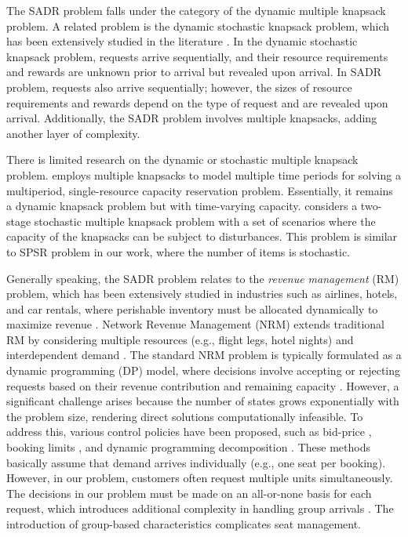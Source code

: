 The SADR problem falls under the category of the dynamic multiple knapsack problem. A related problem is the dynamic stochastic knapsack problem, which has been extensively studied in the literature \citep{kleywegt1998dynamic, kleywegt2001dynamic, papastavrou1996dynamic}. In the dynamic stochastic knapsack problem, requests arrive sequentially, and their resource requirements and rewards are unknown prior to arrival but revealed upon arrival. In SADR problem, requests also arrive sequentially; however, the sizes of resource requirements and rewards depend on the type of request and are revealed upon arrival. Additionally, the SADR problem involves multiple knapsacks, adding another layer of complexity.


There is limited research on the dynamic or stochastic multiple knapsack problem. \citep{perry2009approximate} employs multiple knapsacks to model multiple time periods for solving a multiperiod, single-resource capacity reservation problem. Essentially, it remains a dynamic knapsack problem but with time-varying capacity. \citep{tonissen2017column} considers a two-stage stochastic multiple knapsack problem with a set of scenarios where the capacity of the knapsacks can be subject to disturbances. This problem is similar to SPSR problem in our work, where the number of items is stochastic.


Generally speaking, the SADR problem relates to the \textit{revenue management} (RM) problem, which has been extensively studied in industries such as airlines, hotels, and car rentals, where perishable inventory must be allocated dynamically to maximize revenue \citep{van2005introduction}. Network Revenue Management (NRM) extends traditional RM by considering multiple resources (e.g., flight legs, hotel nights) and interdependent demand \citep{williamson1992airline}. The standard NRM problem is typically formulated as a dynamic programming (DP) model, where decisions involve accepting or rejecting requests based on their revenue contribution and remaining capacity \citep{talluri1998analysis}. However, a significant challenge arises because the number of states grows exponentially with the problem size, rendering direct solutions computationally infeasible. To address this, various control policies have been proposed, such as bid-price \citep{adelman2007dynamic, bertsimas2003revenue}, booking limits \citep{gallego1997multiproduct}, and dynamic programming decomposition \citep{talluri2006theory, liu2008choice}. These methods basically assume that demand arrives individually (e.g., one seat per booking). However, in our problem, customers often request multiple units simultaneously. The decisions in our problem must be made on an all-or-none basis for each request, which introduces additional complexity in handling group arrivals \citep{talluri2006theory}. The introduction of group-based characteristics complicates seat management.

